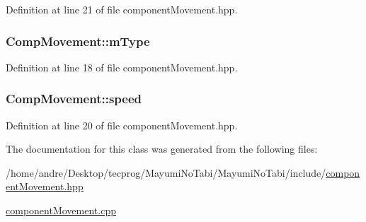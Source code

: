 Definition at line 21 of file component\-Movement.\-hpp.

\hypertarget{class_comp_movement_a3ce2f7a3d0feb7684213440ec2f971a9}{
\subsubsection[{m\-Type}]{ Comp\-Movement\-::m\-Type}}\label{class_comp_movement_a3ce2f7a3d0feb7684213440ec2f971a9}


Definition at line 18 of file component\-Movement.\-hpp.

\hypertarget{class_comp_movement_acbead672c47587a0221fae8ecd97258e}{
\subsubsection[{speed}]{ Comp\-Movement\-::speed}}\label{class_comp_movement_acbead672c47587a0221fae8ecd97258e}


Definition at line 20 of file component\-Movement.\-hpp.



The documentation for this class was generated from the following files\-:\begin{DoxyCompactItemize}
\item 
/home/andre/\-Desktop/tecprog/\-Mayumi\-No\-Tabi/\-Mayumi\-No\-Tabi/include/\hyperlink{component_movement_8hpp}{component\-Movement.\-hpp}\item 
\hyperlink{component_movement_8cpp}{component\-Movement.\-cpp}\end{DoxyCompactItemize}
